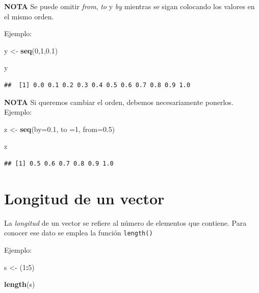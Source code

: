 \documentclass[
]{book}
\newenvironment{Shaded}{\begin{snugshade}}{\end{snugshade}}
\newcommand{\AttributeTok}[1]{\textcolor[rgb]{0.13,0.29,0.53}{#1}}
\newcommand{\DecValTok}[1]{\textcolor[rgb]{0.00,0.00,0.81}{#1}}
\newcommand{\FloatTok}[1]{\textcolor[rgb]{0.00,0.00,0.81}{#1}}
\newcommand{\FunctionTok}[1]{\textcolor[rgb]{0.13,0.29,0.53}{\textbf{#1}}}
\newcommand{\NormalTok}[1]{#1}
\newcommand{\OtherTok}[1]{\textcolor[rgb]{0.56,0.35,0.01}{#1}}
\newcommand{\SpecialCharTok}[1]{\textcolor[rgb]{0.81,0.36,0.00}{\textbf{#1}}}
\begin{document}
\textbf{NOTA} Se puede omitir \emph{from}, \emph{to} y \emph{by} mientras se sigan colocando los valores en el mismo orden.

Ejemplo:

\begin{Shaded}
\begin{Highlighting}[]
\NormalTok{y }\OtherTok{\textless{}{-}} \FunctionTok{seq}\NormalTok{(}\DecValTok{0}\NormalTok{,}\DecValTok{1}\NormalTok{,}\FloatTok{0.1}\NormalTok{)}

\NormalTok{y}
\end{Highlighting}
\end{Shaded}

\begin{verbatim}
##  [1] 0.0 0.1 0.2 0.3 0.4 0.5 0.6 0.7 0.8 0.9 1.0
\end{verbatim}

\textbf{NOTA} Si queremos cambiar el orden, debemos necesariamente ponerlos.
Ejemplo:

\begin{Shaded}
\begin{Highlighting}[]
\NormalTok{z }\OtherTok{\textless{}{-}} \FunctionTok{seq}\NormalTok{(}\AttributeTok{by=}\FloatTok{0.1}\NormalTok{, }\AttributeTok{to =}\DecValTok{1}\NormalTok{, }\AttributeTok{from=}\FloatTok{0.5}\NormalTok{)}

\NormalTok{z}
\end{Highlighting}
\end{Shaded}

\begin{verbatim}
## [1] 0.5 0.6 0.7 0.8 0.9 1.0
\end{verbatim}

\section{Longitud de un vector}\label{longitud-de-un-vector}

La \emph{longitud} de un vector se refiere al número de elementos que contiene. Para conocer ese dato se emplea la función \texttt{length()}

Ejemplo:

\begin{Shaded}
\begin{Highlighting}[]
\NormalTok{s }\OtherTok{\textless{}{-}}\NormalTok{ (}\DecValTok{1}\SpecialCharTok{:}\DecValTok{5}\NormalTok{)}

\FunctionTok{length}\NormalTok{(s)}
\end{Highlighting}
\end{Shaded}
\end{document}
